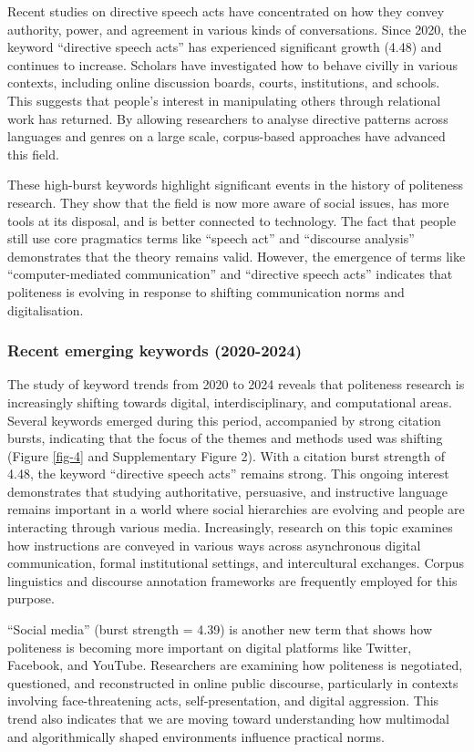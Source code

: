 \documentclass[english]{textolivre}
\begin{document}
Recent studies on directive speech acts have concentrated on how they convey authority, power, and agreement in various kinds of conversations. Since 2020, the keyword ``directive speech acts'' has experienced significant growth (4.48) and continues to increase. Scholars have investigated how to behave civilly in various contexts, including online discussion boards, courts, institutions, and schools. This suggests that people’s interest in manipulating others through relational work has returned. By allowing researchers to analyse directive patterns across languages and genres on a large scale, corpus-based approaches have advanced this field.

These high-burst keywords highlight significant events in the history of politeness research. They show that the field is now more aware of social issues, has more tools at its disposal, and is better connected to technology. The fact that people still use core pragmatics terms like ``speech act'' and ``discourse analysis'' demonstrates that the theory remains valid. However, the emergence of terms like ``computer-mediated communication'' and ``directive speech acts'' indicates that politeness is evolving in response to shifting communication norms and digitalisation.

\subsubsection{Recent emerging keywords (2020-2024)}
The study of keyword trends from 2020 to 2024 reveals that politeness research is increasingly shifting towards digital, interdisciplinary, and computational areas. Several keywords emerged during this period, accompanied by strong citation bursts, indicating that the focus of the themes and methods used was shifting (Figure \ref{fig-4} and Supplementary Figure 2). With a citation burst strength of 4.48, the keyword ``directive speech acts'' remains strong. This ongoing interest demonstrates that studying authoritative, persuasive, and instructive language remains important in a world where social hierarchies are evolving and people are interacting through various media. Increasingly, research on this topic examines how instructions are conveyed in various ways across asynchronous digital communication, formal institutional settings, and intercultural exchanges. Corpus linguistics and discourse annotation frameworks are frequently employed for this purpose.

``Social media'' (burst strength = 4.39) is another new term that shows how politeness is becoming more important on digital platforms like Twitter, Facebook, and YouTube. Researchers are examining how politeness is negotiated, questioned, and reconstructed in online public discourse, particularly in contexts involving face-threatening acts, self-presentation, and digital aggression. This trend also indicates that we are moving toward understanding how multimodal and algorithmically shaped environments influence practical norms.
\end{document}
